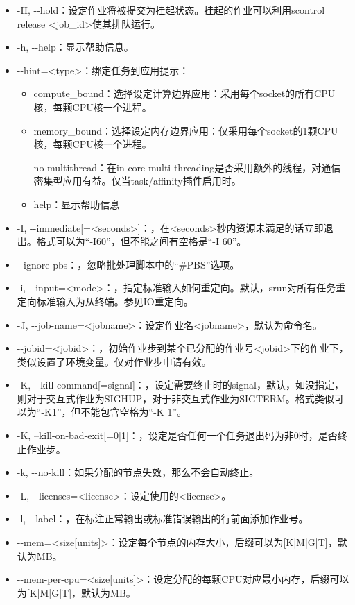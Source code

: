 \begin{itemize}
    \item -H, -{}-hold：设定作业将被提交为挂起状态。挂起的作业可以利用scontrol release <job\_id>使其排队运行。
    \item -h, -{}-help：显示帮助信息。
    \item -{}-hint=<type>：绑定任务到应用提示：
	\begin{itemize}
		\item compute\_bound：选择设定计算边界应用：采用每个socket的所有CPU核，每颗CPU核一个进程。
		\item memory\_bound：选择设定内存边界应用：仅采用每个socket的1颗CPU核，每颗CPU核一个进程。
		\item [no]multithread：在in-core multi-threading是否采用额外的线程，对通信密集型应用有益。仅当task/affinity插件启用时。
		\item help：显示帮助信息
	\end{itemize}
    \item -I, -{}-immediate[=<seconds>]：，在<seconds>秒内资源未满足的话立即退出。格式可以为``-I60''，但不能之间有空格是``-I 60''。
	\item -{}-ignore-pbs：，忽略批处理脚本中的``\#PBS''选项。
	\item -i, -{}-input=<mode>：，指定标准输入如何重定向。默认，srun对所有任务重定向标准输入为从终端。参见IO重定向。
    \item -J, -{}-job-name=<jobname>：设定作业名<jobname>，默认为命令名。
	\item -{}-jobid=<jobid>：，初始作业步到某个已分配的作业号<jobid>下的作业下，类似设置了环境变量。仅对作业步申请有效。
    \item -K, -{}-kill-command[=signal]：，设定需要终止时的signal，默认，如没指定，则对于交互式作业为SIGHUP，对于非交互式作业为SIGTERM。格式类似可以为``-K1''，但不能包含空格为``-K 1''。
	\item -K, --kill-on-bad-exit[=0|1]：，设定是否任何一个任务退出码为非0时，是否终止作业步。
    \item -k, -{}-no-kill：如果分配的节点失效，那么不会自动终止。
    \item -L, -{}-licenses=<license>：设定使用的<license>。
	\item -l, -{}-label：，在标注正常输出或标准错误输出的行前面添加作业号。
    \item -{}-mem=<size[units]>：设定每个节点的内存大小，后缀可以为[K|M|G|T]，默认为MB。
    \item -{}-mem-per-cpu=<size[units]>：设定分配的每颗CPU对应最小内存，后缀可以为[K|M|G|T]，默认为MB。

\end{itemize}
